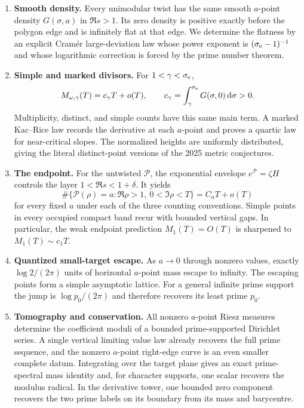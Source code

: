 \documentclass[11pt]{article}
\theoremstyle{definition}
\theoremstyle{remark}
\newcommand{\cP}{\mathcal P}
\newcommand{\dd}{\,\mathrm d}
\begin{document}
\begin{enumerate}[label=\textup{(\Roman*)},leftmargin=2.4em]
\item \textbf{Smooth density.}
Every unimodular twist has the same smooth $a$-point density $G(\sigma,a)$ in
$\Re s>1$.  Its zero density is positive exactly before the polygon edge and is
infinitely flat at that edge.  We determine the flatness by an explicit Cram\'er
large-deviation law whose power exponent is $(\sigma_{\rm e}-1)^{-1}$ and whose
logarithmic correction is forced by the prime number theorem.

\item \textbf{Simple and marked divisors.}
For $1<\gamma<\sigma_{\rm e}$,
\[
 M_{\omega,\gamma}(T)=c_\gamma T+o(T),\qquad
 c_\gamma=\int_\gamma^{\sigma_{\rm e}}G(\sigma,0)\dd\sigma>0.
\]
Multiplicity, distinct, and simple counts have this same main term.  A marked
Kac--Rice law records the derivative at each $a$-point and proves a quartic law for
near-critical slopes.  The normalized heights are uniformly distributed, giving the
literal distinct-point versions of the 2025 metric conjectures.

\item \textbf{The endpoint.}
For the untwisted $\cP$, the exponential envelope
$e^{\cP}=\zeta H$ controls the layer $1<\Re s<1+\delta$.  It yields
\[
 \#\{\cP(\rho)=a:\Re\rho>1,\ 0<\Im\rho<T\}
 =C_aT+o(T)
\]
for every fixed $a$ under each of the three counting conventions.  Simple points in
every occupied compact band recur with bounded vertical gaps.  In particular, the weak
endpoint prediction $M_1(T)=O(T)$ is sharpened to $M_1(T)\sim c_1T$.

\item \textbf{Quantized small-target escape.}
As $a\to0$ through nonzero values, exactly $\log2/(2\pi)$ units of horizontal
$a$-point mass escape to infinity.  The escaping points form a simple asymptotic
lattice.  For a general infinite prime support the jump is $\log p_0/(2\pi)$ and
therefore recovers its least prime $p_0$.

\item \textbf{Tomography and conservation.}
All nonzero $a$-point Riesz measures determine the coefficient moduli of a bounded
prime-supported Dirichlet series.  A single vertical limiting value law already recovers
the full prime sequence, and the nonzero $a$-point right-edge curve is an even smaller
complete datum.  Integrating over the target plane gives an exact prime-spectral mass
identity and, for character supports, one scalar recovers the modulus radical.  In the
derivative tower, one bounded zero component recovers the two prime labels on its
boundary from its mass and barycentre.


\end{enumerate}
\end{document}

